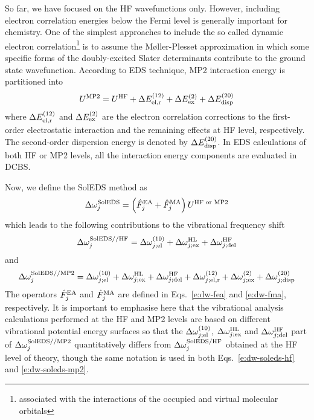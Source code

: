 \documentclass[b5paper,oneside,fleqn,11pt]{book}
\begin{document}
\begin{refsection}
So far, we have focused on the HF wavefunctions only. \citep{Roothaan.RevModPhys.1951} 
However, including
electron correlation energies below the Fermi level is generally important
for chemistry. One of the simplest approaches to include the 
so called dynamic electron correlation\footnote{associated with
the interactions of the occupied and virtual molecular orbitals}
is to assume the 
M{\o}ller\hyp{}Plesset approximation \citep{Moller.Plesset.PhysRev.1934}
in which some specific forms of the doubly\hyp{}excited Slater
determinants contribute to the ground state wavefunction.
According to EDS technique, MP2 interaction energy is
partitioned into
%
\begin{equation}
 U^{\rm MP2} = U^{\rm HF}                    + 
               \Delta E_{\rm el,r}^{(12)}    + 
               \Delta E_{\rm ex}^{(2)}       +
               \Delta E_{\rm disp}^{(20)}  
\end{equation}
%
where $\Delta E_{\rm el,r}^{(12)}$ and $\Delta E_{\rm ex}^{(2)}$
are the electron correlation corrections to the first\hyp{}order
electrostatic interaction and the remaining effects at HF level,
respectively. The second\hyp{}order dispersion energy
is denoted by $\Delta E_{\rm disp}^{(20)}$. In EDS calculations
of both HF or MP2 levels,
all the interaction energy components are evaluated in DCBS.

Now, we define the SolEDS method as
%
\begin{equation} \label{e:dw-soleds}
 \Delta\omega_j^{\rm SolEDS} = \left(\hat{F}_j^{\rm EA} + \hat{F}_j^{\rm MA}\right)  U^{\rm HF\text{ or }MP2} 
\end{equation}
%
which leads to the following contributions to the vibrational
frequency shift
%
\begin{equation} \label{e:dw-soleds-hf}
 \Delta\omega_j^{\rm SolEDS//HF} = 
              \Delta \omega_{j;{\rm el}}^{(10)}    + 
              \Delta \omega_{j;{\rm ex}}^{\rm HL}  +
              \Delta \omega_{j;{\rm del}}^{\rm HF}
\end{equation}
%
and
%
\begin{equation} \label{e:dw-soleds-mp2}
 \Delta\omega_j^{\rm SolEDS//MP2} = 
              \Delta \omega_{j;{\rm el}}^{(10)}    + 
              \Delta \omega_{j;{\rm ex}}^{\rm HL}  +
              \Delta \omega_{j;{\rm del}}^{\rm HF} +
               \Delta \omega_{j;{\rm el,r}}^{(12)}    + 
               \Delta \omega_{j;{\rm ex}}^{(2)}       +
               \Delta \omega_{j;{\rm disp}}^{(20)}  
\end{equation}
%
The operators $\hat{F}_j^{\rm EA}$ and $\hat{F}_j^{\rm MA}$
are defined in Eqs.~\eqref{e:dw-fea} and \eqref{e:dw-fma}, respectively.
It is important to emphasise here that the vibrational analysis 
calculations performed at the HF and MP2 levels are based on different
vibrational potential energy surfaces so that the $\Delta \omega_{j;{\rm el}}^{(10)}$,
$\Delta \omega_{j;{\rm ex}}^{\rm HL}$ and $\Delta \omega_{j;{\rm del}}^{\rm HF}$ 
part of $\Delta\omega_j^{\rm SolEDS//MP2}$ quantitatively differs from
$\Delta\omega_j^{\rm SolEDS/HF}$ obtained at the HF level of theory,
though the same notation is used in both Eqs.~\eqref{e:dw-soleds-hf} 
and \eqref{e:dw-soleds-mp2}.


\end{refsection}
\end{document}
